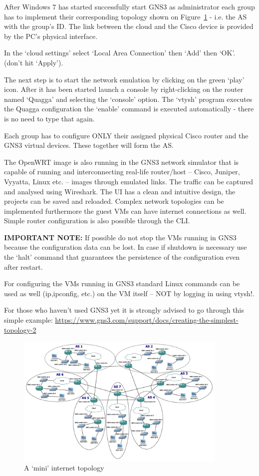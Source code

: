 \documentclass[a4paper]{article}
\begin{document}
After Windows 7 has started successfully start GNS3 as administrator each group has to implement their corresponding
topology shown on Figure~\ref{fig:mini-internet} - i.e. the AS with the group's ID. The link between the cloud and the
Cisco device is provided by the PC's physical interface.

In the `cloud settings' select `Local Area Connection' then `Add' then `OK'. (don't hit `Apply').

The next step is to start the network emulation by clicking on the green `play' icon. After it has been started launch
a console by right-clicking on the router named `Quagga' and selecting the `console' option. The `vtysh' program
executes the Quagga configuration the `enable' command is executed automatically - there is no need to type that again.

Each group has to configure ONLY their assigned physical Cisco router and the GNS3 virtual devices. These together will
form the AS.

The OpenWRT image is also running in the GNS3 network simulator that is capable of running and interconnecting
real-life router/host -- Cisco, Juniper, Vyyatta, Linux etc. -- images through emulated links. The traffic can be
captured and analysed using Wireshark. The UI has a clean and intuitive design, the projects can be saved and reloaded.
Complex network topologies can be implemented furthermore the guest VMs can have internet connections as well. Simple
router configuration is also possible through the CLI.

\textbf{IMPORTANT NOTE:} If possible do not stop the VMs running in GNS3 because the configuration data can be lost. In
case if shutdown is necessary use the `halt' command that guarantees the persistence of the configuration even after
restart.

For configuring the VMs running in GNS3 standard Linux commands can be used as well (ip,ipconfig, etc.) on the VM
itself --  NOT by logging in using vtysh!.

For those who haven't used GNS3 yet it is strongly advised to go through this simple example:
\url{https://www.gns3.com/support/docs/creating-the-simplest-topology-2}

\begin{figure}[H]
    \centering
    \includegraphics[width=0.9\textwidth]{figures/mini_internet.png}
    \caption{A `mini' internet topology}
    \label{fig:mini-internet}
\end{figure}
\end{document}
